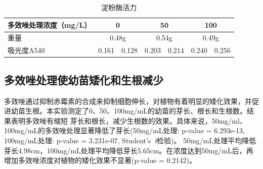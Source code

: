 \documentclass[UTF8]{ctexart}
\begin{document}
    \begin{table}[!h]
        \centering
        \setlength{\abovecaptionskip}{0.cm}
        \caption{淀粉酶活力}
        \begin{tabular}{lclclcl}
        \hline
        多效唑处理浓度（mg/L） & \multicolumn{2}{c}{0}             & \multicolumn{2}{c}{50}            & \multicolumn{2}{c}{100}          \\ \hline
        重量            & \multicolumn{2}{c}{0.48g}         & \multicolumn{2}{c}{0.54g}         & \multicolumn{2}{c}{0.49g}        \\
        吸光度A540       & \multicolumn{1}{l}{0.161} & 0.128 & \multicolumn{1}{l}{0.203} & 0.214 & \multicolumn{1}{l}{0.240} & 0.256 \\ \hline
        \end{tabular}
    \end{table}

    \subsection{多效唑处理使幼苗矮化和生根减少}
    多效唑通过抑制赤霉素的合成来抑制细胞伸长，对植物有着明显的矮化效果，并促进幼苗生根。本实验测定了0、50、100mg/mL的幼苗的芽长、根长和生根数。结果表明多效唑有缩短
    芽长和根长，减少生根数的效果。具体来说，50mg/ml、100mg/mL的多效唑处理显著降低了芽长(50mg/mL处理: p-value = 6.293e-13, 100mg/mL处理: p-value = 3.231e-07, Student's\ \textit{t}检验)。
    50mg/mL处理平均降低芽长4.98cm，100mg/mL处理平均降低芽长5.65cm。在浓度达到50mg/mL后，再增加多效唑浓度对植物的矮化效果不显著(p-value = 0.2142)。
    

\end{document}
